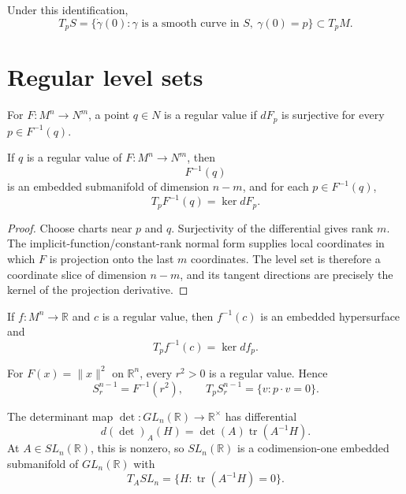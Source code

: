 \begin{theorem}\label{thm:vii06-curve-tangent}
Under this identification,
\[
T_pS=\{\dot\gamma(0):\gamma\text{ is a smooth curve in }S,\ \gamma(0)=p\}\subset T_pM.
\]
\end{theorem}

\section{Regular level sets}
\begin{definition}\label{def:vii06-regular-value}
For \(F:M^n\to N^m\), a point \(q\in N\) is a regular value if \(dF_p\) is surjective for every \(p\in F^{-1}(q)\).
\end{definition}

\begin{theorem}\label{thm:vii06-regular-level}
If \(q\) is a regular value of \(F:M^n\to N^m\), then
\[
F^{-1}(q)
\]
is an embedded submanifold of dimension \(n-m\), and for each \(p\in F^{-1}(q)\),
\[
T_pF^{-1}(q)=\ker dF_p.
\]
\end{theorem}
\begin{proof}
Choose charts near \(p\) and \(q\). Surjectivity of the differential gives rank \(m\). The implicit-function/constant-rank normal form supplies local coordinates in which \(F\) is projection onto the last \(m\) coordinates. The level set is therefore a coordinate slice of dimension \(n-m\), and its tangent directions are precisely the kernel of the projection derivative.
\end{proof}

\begin{corollary}[Hypersurfaces]\label{cor:vii06-hypersurface}
If \(f:M^n\to\mathbb R\) and \(c\) is a regular value, then \(f^{-1}(c)\) is an embedded hypersurface and
\[
T_pf^{-1}(c)=\ker df_p.
\]
\end{corollary}

\begin{example}[Sphere]\label{ex:vii06-sphere}
For \(F(x)=\|x\|^2\) on \(\mathbb R^n\), every \(r^2>0\) is a regular value. Hence
\[
S_r^{n-1}=F^{-1}(r^2),
\qquad
T_pS_r^{n-1}=\{v:p\cdot v=0\}.
\]
\end{example}

\begin{example}\label{ex:vii06-sl}
The determinant map \(\det:GL_n(\mathbb R)\to\mathbb R^\times\) has differential
\[
d(\det)_A(H)=\det(A)\operatorname{tr}(A^{-1}H).
\]
At \(A\in SL_n(\mathbb R)\), this is nonzero, so \(SL_n(\mathbb R)\) is a codimension-one embedded submanifold of \(GL_n(\mathbb R)\) with
\[
T_A SL_n=\{H:\operatorname{tr}(A^{-1}H)=0\}.
\]
\end{example}

